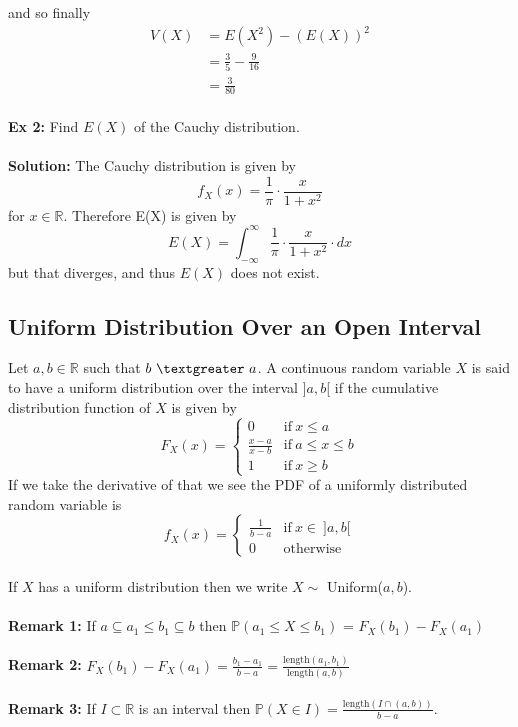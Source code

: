 \documentclass{article}
\newcommand{\R}{\mathbb{R}}
\newcommand{\bbP}{\mathbb{P}}
\newcommand{\gt}{\textgreater}
\newcommand{\x}{\cdot}
\begin{document}
and so finally
\begin{align*}
	V(X) &= E(X^2) - (E(X))^2\\
		&= \frac{3}{5} - \frac{9}{16}\\
		&= \frac{3}{80}
\end{align*}
\ \\
\textbf{Ex 2:} Find $E(X)$ of the Cauchy distribution.\\\\
\textbf{Solution:} The Cauchy distribution is given by
\[f_{X}(x) = \frac{1}{\pi}\x \frac{x}{1+x^2}\]
for $x \in \R$. Therefore E(X) is given by
\[E(X) = \int_{-\infty}^{\infty} \frac{1}{\pi}\x \frac{x}{1+x^2}\x dx\]
but that diverges, and thus $E(X)$ does not exist.
\subsection{Uniform Distribution Over an Open Interval}
Let $a, b \in \R$ such that $b\ \gt\ a$. A continuous random variable $X$ is said to have a uniform distribution over the interval ]$a, b$[ if the cumulative distribution function of $X$ is given by
\[
F_X(x) =
\begin{cases}
	0 &\text{if}\ x \leq a\\
	\frac{x-a}{x-b} &\text{if}\ a \leq x \leq b\\
	1 &\text{if}\ x \geq b
\end{cases}
\]
If we take the derivative of that we see the PDF of a uniformly distributed random variable is
\[
f_{X}(x) =
\begin{cases}
	\frac{1}{b-a} &\text{if}\ x\in\ ]a, b[\\
	0 &\text{otherwise}
\end{cases}
\]\\
If $X$ has a uniform distribution then we write $X \sim$ Uniform($a, b$).\\\\
\textbf{Remark 1:} If $a \subseteq a_{1} \leq b_{1} \subseteq b$ then $\bbP(a_{1} \leq X \leq b_{1})$ = $F_{X}(b_{1}) - F_{X}(a_{1})$\\\\
\textbf{Remark 2:} $F_{X}(b_{1}) - F_{X}(a_{1}) = \frac{b_{1} - a_{1}}{b-a} = \frac{\text{length}(a_{1}, b_{1})}{\text{length}(a, b)}$\\\\
\textbf{Remark 3:} If $I \subset \R$ is an interval then $\bbP(X\in I) = \frac{\text{length}(I \cap (a, b))}{b-a}$.\\\\\\
\end{document}
